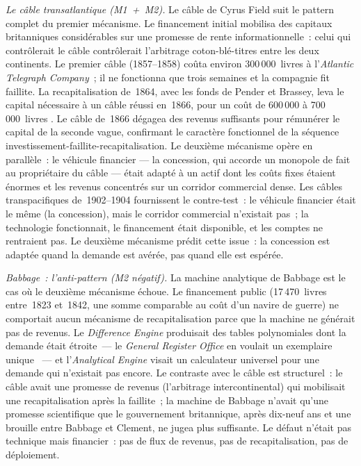 \emph{Le câble transatlantique (M1~+~M2).} Le câble de Cyrus Field suit le pattern complet du premier mécanisme. Le financement initial mobilisa des capitaux britanniques considérables sur une promesse de rente informationnelle~: celui qui contrôlerait le câble contrôlerait l'arbitrage coton-blé-titres entre les deux continents. Le premier câble (1857--1858) coûta environ 300\,000~livres à l'\emph{Atlantic Telegraph Company}~; il ne fonctionna que trois semaines et la compagnie fit faillite. La recapitalisation de~1864, avec les fonds de Pender et Brassey, leva le capital nécessaire à un câble réussi en~1866, pour un coût de 600\,000 à 700\,000~livres \parencite{gordon_thread_2002}. Le câble de~1866 dégagea des revenus suffisants pour rémunérer le capital de la seconde vague, confirmant le caractère fonctionnel de la séquence investissement-faillite-recapitalisation. Le deuxième mécanisme opère en parallèle~: le véhicule financier --- la concession, qui accorde un monopole de fait au propriétaire du câble --- était adapté à un actif dont les coûts fixes étaient énormes et les revenus concentrés sur un corridor commercial dense. Les câbles transpacifiques de~1902--1904 fournissent le contre-test~: le véhicule financier était le même (la concession), mais le corridor commercial n'existait pas~; la technologie fonctionnait, le financement était disponible, et les comptes ne rentraient pas. Le deuxième mécanisme prédit cette issue~: la concession est adaptée quand la demande est avérée, pas quand elle est espérée.

\emph{Babbage~: l'anti-pattern (M2 négatif).} La machine analytique de Babbage est le cas où le deuxième mécanisme échoue. Le financement public (17\,470~livres entre~1823 et~1842, une somme comparable au coût d'un navire de guerre) ne comportait aucun mécanisme de recapitalisation parce que la machine ne générait pas de revenus. Le \emph{Difference Engine} produisait des tables polynomiales dont la demande était étroite~--- le \emph{General Register Office} en voulait un exemplaire unique \parencite{swade_difference_2001}~--- et l'\emph{Analytical Engine} visait un calculateur universel pour une demande qui n'existait pas encore. Le contraste avec le câble est structurel~: le câble avait une promesse de revenus (l'arbitrage intercontinental) qui mobilisait une recapitalisation après la faillite~; la machine de Babbage n'avait qu'une promesse scientifique que le gouvernement britannique, après dix-neuf ans et une brouille entre Babbage et Clement, ne jugea plus suffisante. Le défaut n'était pas technique mais financier~: pas de flux de revenus, pas de recapitalisation, pas de déploiement.


